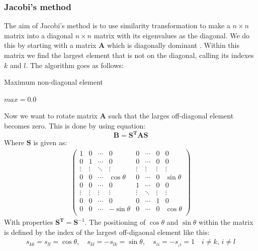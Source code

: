 \documentclass{article}
\newcommand\ppmat[1]{\begin{pmatrix}#1\end{pmatrix}}
\newcommand{\V}[1]{\mathbf{#1}}
\begin{document}
\subsubsection{Jacobi's method}
The aim of Jacobi's method is to use similarity transformation to make a $n \times n$ matrix into a diagonal $n \times n$ matrix with its eigenvalues as the diagonal. We do this by starting with a matrix $\V{A}$ which is diagonally dominant \cite{DDMatrix}. Within this matrix we find the largest element that is not on the diagonal, calling its indexes $k$ and $l$. The algorithm goes as follows:
\begin{algorithm}[H]
\small
\caption{Maximum non-diagonal element}\label{alg:max_offdiag}
\begin{algorithmic}[1]
\State $max = 0.0$
\EndIf
\EndFor
\EndFor
\end{algorithmic}
\end{algorithm}
Now we want to rotate matrix $\V{A}$ such that the larges off-diagonal element becomes zero. This is done by using equation:
\begin{equation}
\V{B} = \V{S}^{\V{T}} \V{A} \V{S}
\label{eq:symtrans}
\end{equation}
Where $\V{S}$ is given as:
\begin{align*}
\ppmat{1 & 0 & \cdots & 0 & 0 & \cdots & 0 & 0 \\
	   0 & 1 & \cdots & 0 & 0 & \cdots & 0 & 0 \\
	   \vdots & \vdots & \ddots & \vdots & \vdots & \vdots & \vdots & \vdots \\
	   0 & 0 & \cdots & \cos \theta & 0 & \cdots & 0 & \sin \theta \\
	   0 & 0 & \cdots & 0 & 1 & \cdots & 0 & 0 \\
	   \vdots & \vdots & \vdots & \vdots & \vdots & \ddots & \vdots & \vdots \\
	   0 & 0 & \cdots & 0 & 0 & \cdots & 1 & 0 \\
	   0 & 0 & \cdots & -\sin \theta & 0 & \cdots & 0 & \cos \theta \\}
\end{align*}
With properties $\V{S}^{\V{T}} = \V{S}^{-1}$.
The positioning of $\cos \theta$ and $\sin \theta$ within the matrix is defined by the index of the largest off-digaonal element like this:
\begin{align*}
s_{kk} = s_{ll} = \cos\theta , \quad s_{kl} = -s_{lk} = \sin \theta, \quad s_{ii} = -s_{_ii} = 1 \quad i \neq k, \, i \neq l
\end{align*}
\end{document}
